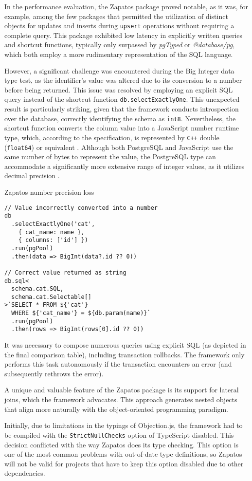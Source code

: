 In the performance evaluation, the Zapatos package proved notable, as it was,
for example, among the few packages that permitted the utilization of distinct
objects for updates and inserts during \texttt{upsert} operations without
requiring a complete query. This package exhibited low latency in explicitly
written queries and shortcut functions, typically only surpassed by
\textit{pgTyped} or \textit{@database/pg}, which both employ a more rudimentary
representation of the SQL language.

However, a significant challenge was encountered during the Big Integer data
type test, as the identifier's value was altered due to its conversion to a
number before being returned. This issue was resolved by employing an explicit
SQL query instead of the shortcut function \texttt{db.selectExactlyOne}. This
unexpected result is particularly striking, given that the framework conducts
introspection over the database, correctly identifying the schema as
\texttt{int8}. Nevertheless, the shortcut function converts the column value
into a JavaScript number runtime type, which, according to the specification, is
represented by \texttt{C++} double (\texttt{float64}) or equivalent
\cite{MDNNumber}. Although both PostgreSQL and JavaScript use the same number of
bytes to represent the value, the PostgreSQL type can accommodate a
significantly more extensive range of integer values, as it utilizes decimal
precision \cite{PostgresNumeric}.

\begin{listing}
\caption{Zapatos number precision loss}

\begin{verbatim}
// Value incorrectly converted into a number
db
  .selectExactlyOne('cat', 
    { cat_name: name }, 
    { columns: ['id'] })
  .run(pgPool)
  .then(data => BigInt(data?.id ?? 0))

// Correct value returned as string
db.sql<
  schema.cat.SQL,
  schema.cat.Selectable[]
>`SELECT * FROM ${'cat'} 
  WHERE ${'cat_name'} = ${db.param(name)}`
  .run(pgPool)
  .then(rows => BigInt(rows[0].id ?? 0))
\end{verbatim}
\end{listing}

It was necessary to compose numerous queries using explicit SQL (as depicted in
the final comparison table), including transaction rollbacks. The framework only
performs this task autonomously if the transaction encounters an error (and
subsequently rethrows the error).

A unique and valuable feature of the Zapatos package is its support for lateral
joins, which the framework advocates. This approach generates nested objects
that align more naturally with the object-oriented programming paradigm.

Initially, due to limitations in the typings of Objection.js, the framework had
to be compiled with the \texttt{StrictNullChecks} option of TypeScript disabled. This
decision conflicted with the way Zapatos does its type checking. This option is
one of the most common problems with out-of-date type definitions, so Zapatos
will not be valid for projects that have to keep this option disabled due to
other dependencies.